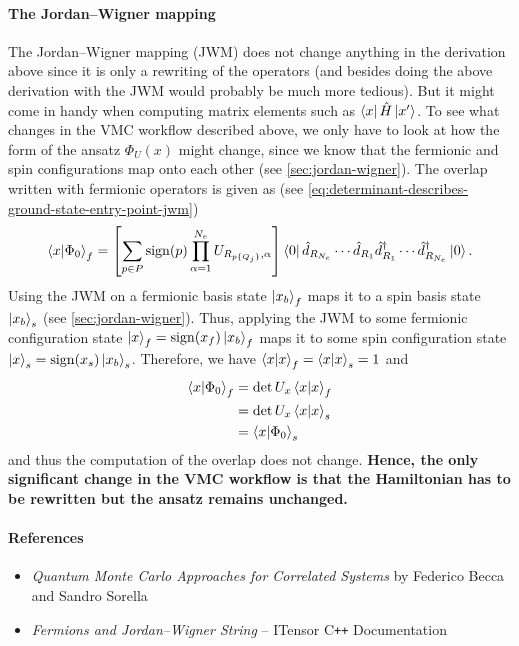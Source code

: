 \documentclass[../../main.tex]{subfiles}
\begin{document}
\paragraph{The Jordan--Wigner mapping}
The Jordan--Wigner mapping (JWM) does not change anything in the derivation above since it is only a rewriting of the operators (and besides doing the above derivation with the JWM would probably be much more tedious). But it might come in handy when computing matrix elements such as $\left\langle x \right\rvert \hat H \left\lvert x' \right\rangle$. To see what changes in the VMC workflow described above, we only have to look at how the form of the ansatz $\Phi_U(x)$ might change, since we know that the fermionic and spin configurations map onto each other (see \cref{sec:jordan-wigner}). The overlap written with fermionic operators is given as (see \cref{eq:determinant-describes-ground-state-entry-point-jwm})
\begin{equation*}
    \left\langle x \middle| \Phi_0 \right\rangle_f
    = \left[\sum_{p\in P}
    \operatorname{sign}(p)
    \prod_{\alpha=1}^{N_{e}}
    U_{R_{p\{Q_j\}},\alpha}\right]
    \left\langle 0 \right\rvert \hat d_{R_{N_{e}}} \cdots \hat d_{R_1}
    \hat d^\dagger_{R_1}
    \cdots
    \hat d^\dagger_{R_{N_{e}}} \left\lvert 0 \right\rangle .
\end{equation*}
Using the JWM on a fermionic basis state $\left\lvert x_b \right\rangle_f$ maps it to a spin basis state $\left\lvert x_b \right\rangle_s$ (see \cref{sec:jordan-wigner}). Thus, applying the JWM to some fermionic configuration state $\left\lvert x \right\rangle_f = \operatorname{sign}(x_f) \left\lvert x_b \right\rangle_f$ maps it to some spin configuration state $\left\lvert x \right\rangle_s = \operatorname{sign}(x_s) \left\lvert x_b \right\rangle_s$. Therefore, we have $\left\langle x \middle| x \right\rangle_f = \left\langle x \middle| x \right\rangle_s = 1$ and 
\begin{align*}
    \left\langle x \middle| \Phi_0 \right\rangle_f
    &= \det U_x
    \left\langle x \middle| x \right\rangle_f \\
    &= \det U_x
    \left\langle x \middle| x \right\rangle_s \\
    &= \left\langle x \middle| \Phi_0 \right\rangle_s
\end{align*}
and thus the computation of the overlap does not change. \textbf{Hence, the only significant change in the VMC workflow is that the Hamiltonian has to be rewritten but the ansatz remains unchanged.} 


\paragraph{References}
\begin{itemize}
    \item \emph{Quantum Monte Carlo Approaches for Correlated Systems} by Federico Becca and Sandro Sorella
    \item \emph{Fermions and Jordan--Wigner String} -- ITensor C\texttt{++} Documentation
\end{itemize}
\end{document}
